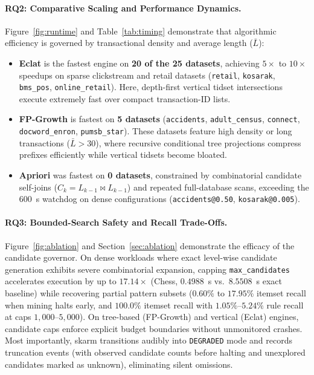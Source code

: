 \documentclass[twocolumn,10pt]{article}
\newcommand{\skarm}{\textsf{skarm}\xspace}
\begin{document}
\paragraph{RQ2: Comparative Scaling and Performance Dynamics.} Figure~\ref{fig:runtime} and Table~\ref{tab:timing} demonstrate that algorithmic efficiency is governed by transactional density and average length ($\bar{L}$):
\begin{itemize}
  \item \textbf{Eclat} is the fastest engine on \textbf{20 of the 25 datasets}, achieving $5\times$ to $10\times$ speedups on sparse clickstream and retail datasets (\texttt{retail}, \texttt{kosarak}, \texttt{bms\_pos}, \texttt{online\_retail}). Here, depth-first vertical tidset intersections execute extremely fast over compact transaction-ID lists.
  \item \textbf{FP-Growth} is fastest on \textbf{5 datasets} (\texttt{accidents}, \texttt{adult\_census}, \texttt{connect}, \texttt{docword\_enron}, \texttt{pumsb\_star}). These datasets feature high density or long transactions ($\bar{L} > 30$), where recursive conditional tree projections compress prefixes efficiently while vertical tidsets become bloated.
  \item \textbf{Apriori} was fastest on \textbf{0 datasets}, constrained by combinatorial candidate self-joins ($C_k = L_{k-1} \bowtie L_{k-1}$) and repeated full-database scans, exceeding the 600~s watchdog on dense configurations (\texttt{accidents@0.50}, \texttt{kosarak@0.005}).
\end{itemize}

\paragraph{RQ3: Bounded-Search Safety and Recall Trade-Offs.} Figure~\ref{fig:ablation} and Section~\ref{sec:ablation} demonstrate the efficacy of the candidate governor. On dense workloads where exact level-wise candidate generation exhibits severe combinatorial expansion, capping \texttt{max\_candidates} accelerates execution by up to $17.14\times$ (Chess, $0.4988$~s vs.\ $8.5508$~s exact baseline) while recovering partial pattern subsets ($0.60\%$ to $17.95\%$ itemset recall when mining halts early, and $100.0\%$ itemset recall with $1.05\%$--$5.24\%$ rule recall at caps $1{,}000$--$5{,}000$). On tree-based (FP-Growth) and vertical (Eclat) engines, candidate caps enforce explicit budget boundaries without unmonitored crashes. Most importantly, \skarm transitions audibly into \texttt{DEGRADED} mode and records truncation events (with observed candidate counts before halting and unexplored candidates marked as unknown), eliminating silent omissions.
\end{document}
